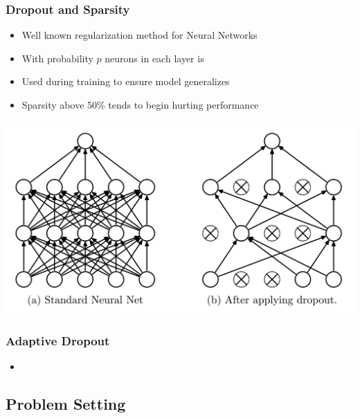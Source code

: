 \documentclass{beamer}
\begin{document}
\begin{frame}
    \frametitle{Dropout and Sparsity}
    \begin{minipage}{0.5\textwidth}
        \begin{itemize}
            \item Well known regularization method for Neural Networks
            \item With probability $p$ neurons in each layer is 
            \item Used during training to ensure model generalizes 
            \item Sparsity above 50\% tends to begin hurting performance
        \end{itemize}
    \end{minipage}\hfill
    \begin{minipage}{0.5\textwidth}
        \includegraphics[width=\textwidth]{images/dropout.png}
    \end{minipage}
    
\end{frame}

\begin{frame}
    \frametitle{Adaptive Dropout}
    \begin{itemize}
        \item \cite{Lei_adaptive_dropout}
    \end{itemize}
    

\end{frame}
\subsection{Problem Setting}
\end{document}
